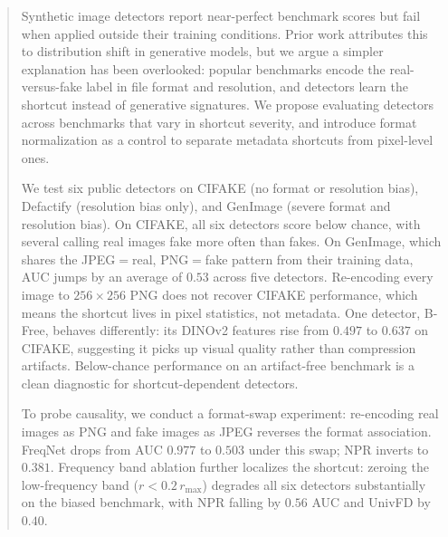 \begin{abstract}
Synthetic image detectors report near-perfect benchmark scores but fail when applied outside their training conditions.
Prior work attributes this to distribution shift in generative models, but we argue a simpler explanation has been overlooked: popular benchmarks encode the real-versus-fake label in file format and resolution, and detectors learn the shortcut instead of generative signatures.
We propose evaluating detectors across benchmarks that vary in shortcut severity, and introduce format normalization as a control to separate metadata shortcuts from pixel-level ones.

We test six public detectors on CIFAKE (no format or resolution bias), Defactify (resolution bias only), and GenImage (severe format and resolution bias).
On CIFAKE, all six detectors score below chance, with several calling real images fake more often than fakes.
On GenImage, which shares the JPEG$=$real, PNG$=$fake pattern from their training data, AUC jumps by an average of $0.53$ across five detectors.
Re-encoding every image to $256\times256$ PNG does not recover CIFAKE performance, which means the shortcut lives in pixel statistics, not metadata.
One detector, B-Free, behaves differently: its DINOv2 features rise from $0.497$ to $0.637$ on CIFAKE, suggesting it picks up visual quality rather than compression artifacts.
Below-chance performance on an artifact-free benchmark is a clean diagnostic for shortcut-dependent detectors.

To probe causality, we conduct a format-swap experiment: re-encoding real images as PNG and fake images as JPEG reverses the format association.
FreqNet drops from AUC $0.977$ to $0.503$ under this swap; NPR inverts to $0.381$.
Frequency band ablation further localizes the shortcut: zeroing the low-frequency band ($r < 0.2\,r_{\max}$) degrades all six detectors substantially on the biased benchmark, with NPR falling by $0.56$ AUC and UnivFD by $0.40$.
\end{abstract}
